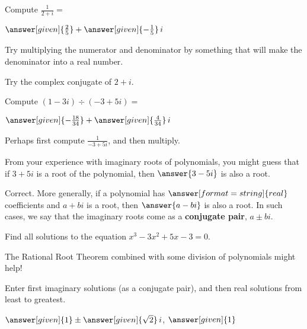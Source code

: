 \documentclass[nooutcomes]{ximera}
\begin{document}
\begin{problem}
Compute $\frac{1}{2+i}=$
\begin{prompt}
	$\answer[given]{\frac{2}{5}} + \answer[given]{-\frac{1}{5}}\,i$
\end{prompt}
\begin{hint}
Try multiplying the numerator and denominator by something that will make the denominator into a real number.  
\end{hint}
\begin{hint}
Try the complex conjugate of $2+i$.
\end{hint}
\end{problem}



\begin{problem}
Compute $(1-3i) \div (-3+5i)=$
\begin{prompt}
	$\answer[given]{-\frac{18}{34}} + \answer[given]{\frac{4}{34}}\,i$
\end{prompt}
\begin{hint}
Perhaps first compute $\frac{1}{-3+5i}$, and then multiply.
\end{hint}
\end{problem}

\begin{problem}
From your experience with imaginary roots of polynomials, you might guess that if $3+5i$ is a root of the polynomial, then $\answer{3-5i}$ is also a root.    
\begin{problem}
Correct.  More generally, if a polynomial has $\answer[format=string]{real}$ coefficients and $a+bi$ is a root, then $\answer{a-bi}$ is also a root.  In such cases, we say that the imaginary roots come as a \textbf{conjugate pair}, $a\pm bi$.  

\end{problem}
\end{problem}


\begin{problem}
Find all solutions to the equation $x^3-3x^2+5x-3=0$. 
\begin{hint} 
The Rational Root Theorem combined with some division of polynomials might help!
\end{hint}
Enter first imaginary solutions (as a conjugate pair), and then real solutions from least to greatest.

\begin{prompt}
$\answer[given]{1} \pm \answer[given]{\sqrt{2}}\,i$, $\answer[given]{1}$
\end{prompt}
\end{problem}
\end{document}
